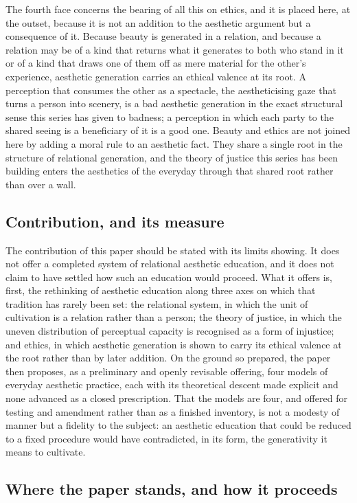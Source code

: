 The fourth face concerns the bearing of all this on ethics, and it is placed here, at the outset, because it is not an addition to the aesthetic argument but a consequence of it. Because beauty is generated in a relation, and because a relation may be of a kind that returns what it generates to both who stand in it or of a kind that draws one of them off as mere material for the other's experience, aesthetic generation carries an ethical valence at its root. A perception that consumes the other as a spectacle, the aestheticising gaze that turns a person into scenery, is a bad aesthetic generation in the exact structural sense this series has given to badness; a perception in which each party to the shared seeing is a beneficiary of it is a good one. Beauty and ethics are not joined here by adding a moral rule to an aesthetic fact. They share a single root in the structure of relational generation, and the theory of justice this series has been building enters the aesthetics of the everyday through that shared root rather than over a wall.

\subsection*{Contribution, and its measure}

The contribution of this paper should be stated with its limits showing. It does not offer a completed system of relational aesthetic education, and it does not claim to have settled how such an education would proceed. What it offers is, first, the rethinking of aesthetic education along three axes on which that tradition has rarely been set: the relational system, in which the unit of cultivation is a relation rather than a person; the theory of justice, in which the uneven distribution of perceptual capacity is recognised as a form of injustice; and ethics, in which aesthetic generation is shown to carry its ethical valence at the root rather than by later addition. On the ground so prepared, the paper then proposes, as a preliminary and openly revisable offering, four models of everyday aesthetic practice, each with its theoretical descent made explicit and none advanced as a closed prescription. That the models are four, and offered for testing and amendment rather than as a finished inventory, is not a modesty of manner but a fidelity to the subject: an aesthetic education that could be reduced to a fixed procedure would have contradicted, in its form, the generativity it means to cultivate.

\subsection*{Where the paper stands, and how it proceeds}

